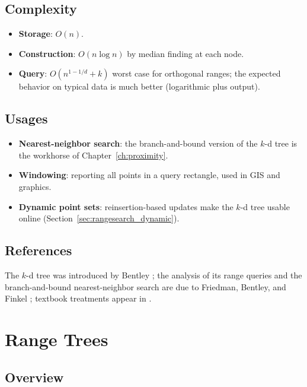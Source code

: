 \subsection{Complexity}

\begin{itemize}
  \item \textbf{Storage}: $O(n)$.
  \item \textbf{Construction}: $O(n \log n)$ by median finding at each node.
  \item \textbf{Query}: $O(n^{1-1/d} + k)$ worst case for orthogonal ranges;
    the expected behavior on typical data is much better (logarithmic plus
    output).
\end{itemize}

\subsection{Usages}

\begin{itemize}
  \item \textbf{Nearest-neighbor search}: the branch-and-bound version of
    the $k$-d tree is the workhorse of Chapter~\ref{ch:proximity}.
  \item \textbf{Windowing}: reporting all points in a query rectangle, used
    in GIS and graphics.
  \item \textbf{Dynamic point sets}: reinsertion-based updates make the
    $k$-d tree usable online (Section~\ref{sec:rangesearch_dynamic}).
\end{itemize}

\subsection{References}

The $k$-d tree was introduced by Bentley \cite{bentley1975}; the analysis
of its range queries and the branch-and-bound nearest-neighbor search are
due to Friedman, Bentley, and Finkel \cite{friedman1977}; textbook
treatments appear in \cite{berg2008,preparata1985}.

\section{Range Trees}
\label{sec:rangesearch_range_trees}

\subsection{Overview}

